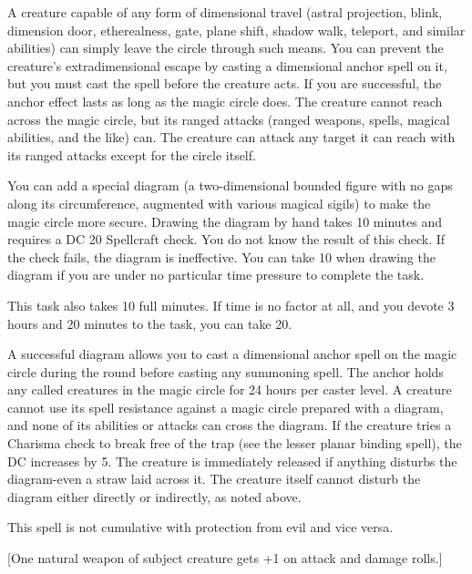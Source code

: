 {A creature capable of any form of dimensional travel (astral projection, blink, dimension door, etherealness, gate, plane shift, shadow walk, teleport, and similar abilities) can simply leave the circle through such means. You can prevent the creature's extradimensional escape by casting a dimensional anchor spell on it, but you must cast the spell before the creature acts. If you are successful, the anchor effect lasts as long as the magic circle does. The creature cannot reach across the magic circle, but its ranged attacks (ranged weapons, spells, magical abilities, and the like) can. The creature can attack any target it can reach with its ranged attacks except for the circle itself.

You can add a special diagram (a two-dimensional bounded figure with no gaps along its circumference, augmented with various magical sigils) to make the magic circle more secure. Drawing the diagram by hand takes 10 minutes and requires a DC 20 Spellcraft check. You do not know the result of this check. If the check fails, the diagram is ineffective. You can take 10 when drawing the diagram if you are under no particular time pressure to complete the task.

This task also takes 10 full minutes. If time is no factor at all, and you devote 3 hours and 20 minutes to the task, you can take 20.

A successful diagram allows you to cast a dimensional anchor spell on the magic circle during the round before casting any summoning spell. The anchor holds any called creatures in the magic circle for 24 hours per caster level. A creature cannot use its spell resistance against a magic circle prepared with a diagram, and none of its abilities or attacks can cross the diagram. If the creature tries a Charisma check to break free of the trap (see the lesser planar binding spell), the DC increases by 5. The creature is immediately released if anything disturbs the diagram-even a straw laid across it. The creature itself cannot disturb the diagram either directly or indirectly, as noted above.

This spell is not cumulative with protection from evil and vice versa.}
        
[One natural weapon of subject creature gets +1 on attack and damage rolls.]
        
